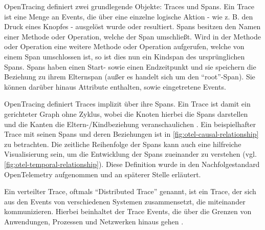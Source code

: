 OpenTracing definiert zwei grundlegende Objekte: Traces und Spans. Ein Trace ist eine Menge an Events, die über eine einzelne logische Aktion - wie z. B. den Druck eines Knopfes - ausgelöst wurde oder resultiert. Spans besitzen den Namen einer Methode oder Operation, welche der Span umschließt. Wird in der Methode oder Operation eine weitere Methode oder Operation aufgerufen, welche von einem Span umschlossen ist, so ist dies nun ein Kindspan des ursprünglichen Spans. Spans haben einen Start- sowie einen Endzeitpunkt und sie speichern die Beziehung zu ihrem Elternspan (außer es handelt sich um den \enquote{root}-Span). Sie können darüber hinaus Attribute enthalten, sowie eingetretene Events.

OpenTracing definiert Traces implizit über ihre Spans. Ein Trace ist damit ein gerichteter Graph ohne Zyklus, wobei die Knoten hierbei die Spans darstellen und die Kanten die Eltern-/Kindbeziehung veranschaulichen \cite{OpenTracingSpecification}. Ein beispielhafter Trace mit seinen Spans und deren Beziehungen ist in \autoref{fig:otel-causal-relationship} zu betrachten. Die zeitliche Reihenfolge der Spans kann auch eine hilfreiche Visualisierung sein, um die Entwicklung der Spans zueinander zu verstehen (vgl. \autoref{fig:otel-temporal-relationship}). Diese Definition wurde in den Nachfolgestandard OpenTelemetry aufgenommen und an späterer Stelle erläutert.

Ein verteilter Trace, oftmals \enquote{Distributed Trace} genannt, ist ein Trace, der sich aus den Events von verschiedenen Systemen zusammensetzt, die miteinander kommunizieren. Hierbei beinhaltet der Trace Events, die über die Grenzen von Anwendungen, Prozessen und Netzwerken hinaus gehen \cite{OpenTracingSpecification}.

